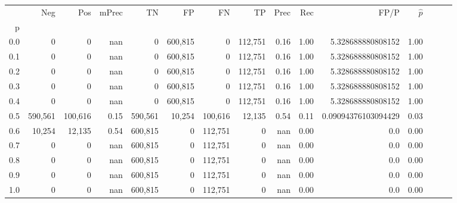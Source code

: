 \begin{tabular}{rrrrrrrrrrrrrrr}
\toprule
{} &      Neg &      Pos & mPrec &       TN &       FP &       FN &       TP &  Prec &   Rec &                 FP/P & $\hat{p}$ \\
p   &          &          &       &          &          &          &          &       &       &                      &           \\
\midrule
0.0 &        0 &        0 &   nan &        0 &  600,815 &        0 &  112,751 &  0.16 &  1.00 &    5.328688880808152 &      1.00 \\
0.1 &        0 &        0 &   nan &        0 &  600,815 &        0 &  112,751 &  0.16 &  1.00 &    5.328688880808152 &      1.00 \\
0.2 &        0 &        0 &   nan &        0 &  600,815 &        0 &  112,751 &  0.16 &  1.00 &    5.328688880808152 &      1.00 \\
0.3 &        0 &        0 &   nan &        0 &  600,815 &        0 &  112,751 &  0.16 &  1.00 &    5.328688880808152 &      1.00 \\
0.4 &        0 &        0 &   nan &        0 &  600,815 &        0 &  112,751 &  0.16 &  1.00 &    5.328688880808152 &      1.00 \\
0.5 &  590,561 &  100,616 &  0.15 &  590,561 &   10,254 &  100,616 &   12,135 &  0.54 &  0.11 &  0.09094376103094429 &      0.03 \\
0.6 &   10,254 &   12,135 &  0.54 &  600,815 &        0 &  112,751 &        0 &   nan &  0.00 &                  0.0 &      0.00 \\
0.7 &        0 &        0 &   nan &  600,815 &        0 &  112,751 &        0 &   nan &  0.00 &                  0.0 &      0.00 \\
0.8 &        0 &        0 &   nan &  600,815 &        0 &  112,751 &        0 &   nan &  0.00 &                  0.0 &      0.00 \\
0.9 &        0 &        0 &   nan &  600,815 &        0 &  112,751 &        0 &   nan &  0.00 &                  0.0 &      0.00 \\
1.0 &        0 &        0 &   nan &  600,815 &        0 &  112,751 &        0 &   nan &  0.00 &                  0.0 &      0.00 \\
\bottomrule
\end{tabular}

